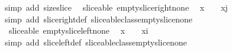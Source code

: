 \begin{isabellebody}
%
\isadelimproof
%
\endisadelimproof
%
\isatagproof
{}\isamarkupfalse%
\ {\isacharparenleft}simp\ add{\isacharcolon}\ size{\isacharunderscore}slice{\isacharparenright}%
\endisatagproof
{\isafoldproof}%
%
\isadelimproof
\isanewline
%
\endisadelimproof
\isanewline
{}\isamarkupfalse%
\ {\isacharparenleft}\ sliceable{\isacharparenright}\ empty{\isacharunderscore}slice{\isacharunderscore}right{\isacharunderscore}none{\isacharcolon}\isanewline
\ \ {\isachardoublequoteopen}{\isacharparenleft}{\isacharhash}x{\isacharparenright}\ {\isacharequal}\ {}\ {\isasymLongrightarrow}\ {\isacharparenleft}{\isacharhash}{\isacharparenleft}x{\isasymdagger}{\isachardot}{\isachardot}j{\isacharparenright}{\isacharparenright}\ {\isacharequal}\ {}{\isachardoublequoteclose}\isanewline
%
\isadelimproof
%
\endisadelimproof
%
\isatagproof
{}\isamarkupfalse%
\ {\isacharparenleft}simp\ add{\isacharcolon}\ slice{\isacharunderscore}right{\isacharunderscore}def\ sliceable{\isacharunderscore}class{\isachardot}empty{\isacharunderscore}slice{\isacharunderscore}none{\isacharparenright}%
\endisatagproof
{\isafoldproof}%
%
\isadelimproof
\isanewline
%
\endisadelimproof
\isanewline
{}\isamarkupfalse%
\ {\isacharparenleft}\ sliceable{\isacharparenright}\ empty{\isacharunderscore}slice{\isacharunderscore}left{\isacharunderscore}none{\isacharcolon}\isanewline
\ \ {\isachardoublequoteopen}{\isacharparenleft}{\isacharhash}x{\isacharparenright}\ {\isacharequal}\ {}\ {\isasymLongrightarrow}\ {\isacharparenleft}{\isacharhash}{\isacharparenleft}x{\isasymdagger}i{\isachardot}{\isachardot}{\isacharparenright}{\isacharparenright}\ {\isacharequal}\ {}{\isachardoublequoteclose}\isanewline
%
\isadelimproof
%
\endisadelimproof
%
\isatagproof
{}\isamarkupfalse%
\ {\isacharparenleft}simp\ add{\isacharcolon}\ slice{\isacharunderscore}left{\isacharunderscore}def\ sliceable{\isacharunderscore}class{\isachardot}empty{\isacharunderscore}slice{\isacharunderscore}none{\isacharparenright}\isanewline
%
\endisatagproof
{\isafoldproof}%
%
\isadelimproof
%
\endisadelimproof
%
\isadelimtheory
%
\endisadelimtheory
%
\isatagtheory
%
\endisatagtheory
{\isafoldtheory}%
%
\isadelimtheory
%
\endisadelimtheory
%
\end{isabellebody}%
